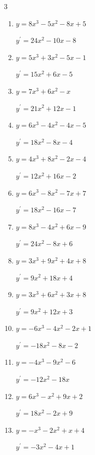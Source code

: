 \begin{multicols}{3}
\begin{enumerate}
  \item $y=8x^{3}-5x^{2}-8x+5$

        $\displaystyle y^{\prime}=24x^{2}-10x-8$

  \item $y=5x^{3}+3x^{2}-5x-1$

        $\displaystyle y^{\prime}=15x^{2}+6x-5$

  \item $y=7x^{3}+6x^{2}-x$

        $\displaystyle y^{\prime}=21x^{2}+12x-1$

  \item $y=6x^{3}-4x^{2}-4x-5$

        $\displaystyle y^{\prime}=18x^{2}-8x-4$

  \item $y=4x^{3}+8x^{2}-2x-4$

        $\displaystyle y^{\prime}=12x^{2}+16x-2$

  \item $y=6x^{3}-8x^{2}-7x+7$

        $\displaystyle y^{\prime}=18x^{2}-16x-7$

  \item $y=8x^{3}-4x^{2}+6x-9$

        $\displaystyle y^{\prime}=24x^{2}-8x+6$

  \item $y=3x^{3}+9x^{2}+4x+8$

        $\displaystyle y^{\prime}=9x^{2}+18x+4$

  \item $y=3x^{3}+6x^{2}+3x+8$

        $\displaystyle y^{\prime}=9x^{2}+12x+3$

\columnbreak %

  \item $y=-6x^{3}-4x^{2}-2x+1$

        $\displaystyle y^{\prime}=-18x^{2}-8x-2$

  \item $y=-4x^{3}-9x^{2}-6$

        $\displaystyle y^{\prime}=-12x^{2}-18x$

  \item $y=6x^{3}-x^{2}+9x+2$

        $\displaystyle y^{\prime}=18x^{2}-2x+9$

  \item $y=-x^{3}-2x^{2}+x+4$

        $\displaystyle y^{\prime}=-3x^{2}-4x+1$


\end{enumerate}
\end{multicols}

